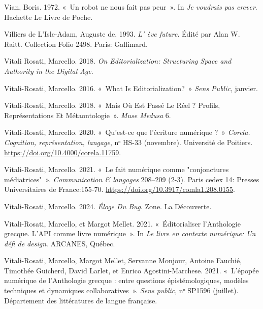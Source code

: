\begin{CSLReferences}{1}{0}
\leavevmode{}%
Vian, Boris. 1972. {«~{Un robot ne nous fait pas peur}~»}. In \emph{{Je
voudrais pas crever}}. {Hachette Le Livre de Poche}.

\leavevmode{}%
Villiers de L'Isle-Adam, Auguste de. 1993. \emph{{L' {è}ve future}}.
Édité par Alan W. Raitt. {Collection Folio} 2498. {Paris}: {Gallimard}.

\leavevmode{}%
Vitali Rosati, Marcello. 2018. \emph{On {Editorialization}: {Structuring
Space} and {Authority} in the {Digital Age}}.

\leavevmode{}%
Vitali-Rosati, Marcello. 2016. {«~What {Is Editorialization}?~»}
\emph{Sens Public}, janvier.

\leavevmode{}%
Vitali-Rosati, Marcello. 2018. {«~Mais O{ù} Est Pass{é} Le R{é}el ?
{Profils}, Repr{é}sentations Et M{é}taontologie~»}. \emph{Muse Medusa}
6.

\leavevmode{}%
Vitali-Rosati, Marcello. 2020. {«~{Qu'est-ce que l'{é}criture
num{é}rique ?}~»} \emph{Corela. Cognition, repr{é}sentation, langage},
nᵒ HS-33 (novembre). {Universit{é} de Poitiers}.
\url{https://doi.org/10.4000/corela.11759}.

\leavevmode{}%
Vitali-Rosati, Marcello. 2021. {«~{Le fait num{é}rique comme
"conjonctures m{é}diatrices"}~»}. \emph{Communication \& langages}
208--209 (2-3). {Paris cedex 14}: {Presses Universitaires de
France}:155‑70. \url{https://doi.org/10.3917/comla1.208.0155}.

\leavevmode{}%
Vitali-Rosati, Marcello. 2024. \emph{{É}loge Du Bug}. Zone. {La
D{é}couverte}.

\leavevmode{}%
Vitali-Rosati, Marcello, et Margot Mellet. 2021. {«~{{É}ditorialiser
l'Anthologie grecque. L'API comme livre num{é}rique}~»}. In \emph{{Le
livre en contexte num{é}rique: Un d{é}fi de design}}. {ARCANES,
Qu{é}bec}.

\leavevmode{}%
Vitali-Rosati, Marcello, Margot Mellet, Servanne Monjour, Antoine
Fauchié, Timothée Guicherd, David Larlet, et Enrico Agostini-Marchese.
2021. {«~{L'{é}pop{é}e num{é}rique de l'Anthologie grecque : entre
questions {é}pist{é}mologiques, mod{è}les techniques et dynamiques
collaboratives}~»}. \emph{Sens public}, nᵒ SP1596 (juillet).
{D{é}partement des litt{é}ratures de langue fran{ç}aise}.


\end{CSLReferences}
